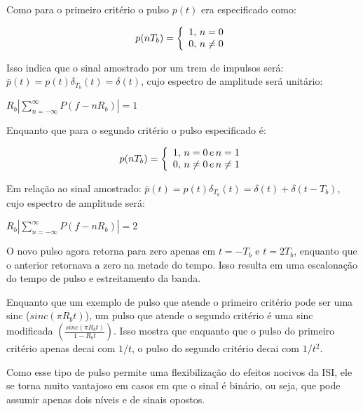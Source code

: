 \begin{subquestion}
    \item Como para o primeiro critério o pulso $p(t)$ era especificado como:
    
    \begin{equation} \label{crit:1}
    \centering
    p(nT_b) = 
    \left \{
    \begin{array}{cc}
    1, \, n=0 \\
    0, \, n\neq 0 \\
    \end{array}
    \right.
    \end{equation}
    
    Isso indica que o sinal amostrado por um trem de impulsos será: $\bar{p}(t) = p(t) \delta_{T_b}(t) = \delta(t)$, cujo espectro de amplitude será unitário:
    
    \begin{center}
        $R_b |\sum_{n=-\infty}^{\infty} P(f-nR_b)| = 1$
    \end{center}
    
    Enquanto que para o segundo critério o pulso especificado é:
    
    \begin{equation} \label{crit:1}
    \centering
    p(nT_b) = 
    \left \{
    \begin{array}{cc}
    1, \, n=0 \, e\, n=1 \\
    0, \, n\neq 0 \, e\, n\neq 1  \\
    \end{array}
    \right.
    \end{equation}
    
    Em relação ao sinal amostrado: $\bar{p}(t) = p(t) \delta_{T_b}(t) = \delta(t) + \delta(t-T_b)$, cujo espectro de amplitude será:
    
    \begin{center}
        $R_b |\sum_{n=-\infty}^{\infty} P(f-nR_b)| = 2$
    \end{center}
    
    O novo pulso agora retorna para zero apenas em $t=-T_b$ e $t=2T_b$, enquanto que o anterior retornava a zero na metade do tempo. Isso resulta em uma escalonação do tempo de pulso e estreitamento da banda.
    
    \item Enquanto que um exemplo de pulso que atende o primeiro critério pode ser uma sinc ($sinc(\pi R_b t)$), um pulso que atende o segundo critério é uma sinc modificada $\left(\frac{sinc(\pi R_b t)}{1-R_b t}\right )$. Isso mostra que enquanto que o pulso do primeiro critério apenas decai com $1/t$, o pulso do segundo critério decai com $1/t^2$.
    
    \item Como esse tipo de pulso permite uma flexibilização do efeitos nocivos da ISI, ele se torna muito vantajoso em casos em que o sinal é binário, ou seja, que pode assumir apenas dois níveis e de sinais opostos.
\end{subquestion}

\newpage